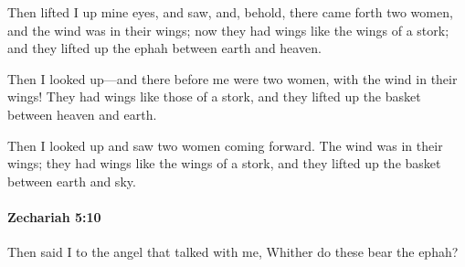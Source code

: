 			\begin{versebox}
					\item[BHS] 
					\item[LXX] 
					\item[ASV] Then lifted I up mine eyes, and saw, and, behold, there came forth two women, and the wind was in their wings; now they had wings like the wings of a stork; and they lifted up the ephah between earth and heaven.
					\item[NIV] Then I looked up—and there before me were two women, with the wind in their wings! They had wings like those of a stork, and they lifted up the basket between heaven and earth.
					\item[NRSV] Then I looked up and saw two women coming forward. The wind was in their wings; they had wings like the wings of a stork, and they lifted up the basket between earth and sky.
			\end{versebox}

		\paragraph{Zechariah 5:10} %
			\label{ZECHARIAH-5-10}

			Then said I to the angel that talked with me, Whither do these bear the ephah?

